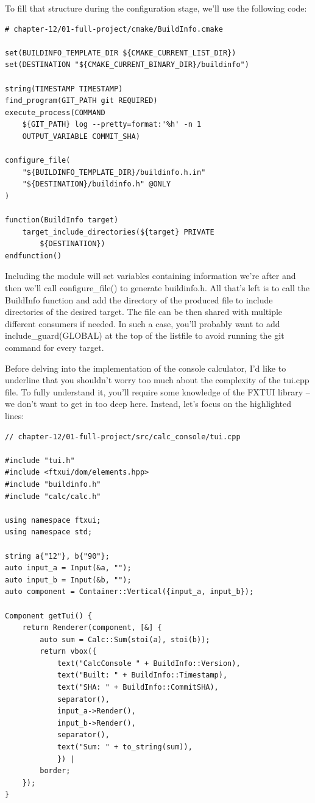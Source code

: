 To fill that structure during the configuration stage, we'll use the following code:

\begin{lstlisting}[style=styleCMake]
# chapter-12/01-full-project/cmake/BuildInfo.cmake

set(BUILDINFO_TEMPLATE_DIR ${CMAKE_CURRENT_LIST_DIR})
set(DESTINATION "${CMAKE_CURRENT_BINARY_DIR}/buildinfo")

string(TIMESTAMP TIMESTAMP)
find_program(GIT_PATH git REQUIRED)
execute_process(COMMAND
	${GIT_PATH} log --pretty=format:'%h' -n 1
	OUTPUT_VARIABLE COMMIT_SHA)

configure_file(
	"${BUILDINFO_TEMPLATE_DIR}/buildinfo.h.in"
	"${DESTINATION}/buildinfo.h" @ONLY
)

function(BuildInfo target)
	target_include_directories(${target} PRIVATE
		${DESTINATION})
endfunction()
\end{lstlisting}

Including the module will set variables containing information we're after and then we'll call configure\_file() to generate buildinfo.h. All that's left is to call the BuildInfo function and add the directory of the produced file to include directories of the desired target. The file can be then shared with multiple different consumers if needed. In such a case, you'll probably want to add include\_guard(GLOBAL) at the top of the listfile to avoid running the git command for every target.

Before delving into the implementation of the console calculator, I'd like to underline that you shouldn't worry too much about the complexity of the tui.cpp file. To fully understand it, you'll require some knowledge of the FXTUI library – we don't want to get in too deep here. Instead, let's focus on the highlighted lines:

\begin{lstlisting}[style=styleCXX]
// chapter-12/01-full-project/src/calc_console/tui.cpp

#include "tui.h"
#include <ftxui/dom/elements.hpp>
#include "buildinfo.h"
#include "calc/calc.h"

using namespace ftxui;
using namespace std;

string a{"12"}, b{"90"};
auto input_a = Input(&a, "");
auto input_b = Input(&b, "");
auto component = Container::Vertical({input_a, input_b});

Component getTui() {
	return Renderer(component, [&] {
		auto sum = Calc::Sum(stoi(a), stoi(b));
		return vbox({
			text("CalcConsole " + BuildInfo::Version),
			text("Built: " + BuildInfo::Timestamp),
			text("SHA: " + BuildInfo::CommitSHA),
			separator(),
			input_a->Render(),
			input_b->Render(),
			separator(),
			text("Sum: " + to_string(sum)),
			}) |
		border;
	});
}
\end{lstlisting}

